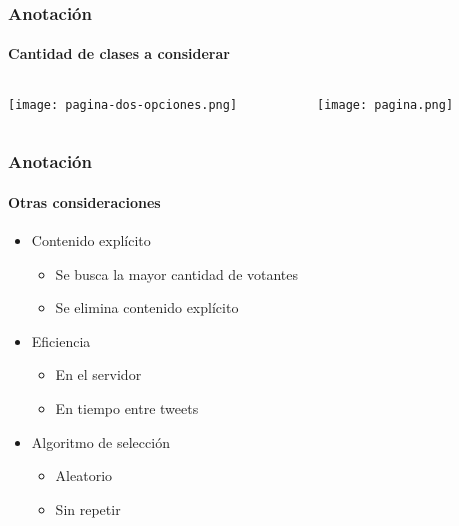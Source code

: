 \begin{frame}
\frametitle{Anotación}
\framesubtitle{Cantidad de clases a considerar}
        \begin{center}
        \begin{columns}[c]
            \begin{column}[c]{0.50\textwidth}
                \centering
                \texttt{[image: pagina-dos-opciones.png]}
            \end{column}
            
            \begin{column}[c]{0.50\textwidth}
                \centering
                \texttt{[image: pagina.png]}
            \end{column}
        \end{columns}
    \end{center}
\end{frame}
\begin{frame}
    \frametitle{Anotación}
    \framesubtitle{Otras consideraciones}

    \begin{itemize}
        \item Contenido explícito

        \begin{itemize}
            \item Se busca la mayor cantidad de votantes
            \item Se elimina contenido explícito
        \end{itemize}

        \item Eficiencia

        \begin{itemize}
            \item En el servidor
            \item En tiempo entre tweets
        \end{itemize}

        \item Algoritmo de selección

        \begin{itemize}
            \item Aleatorio
            \item Sin repetir
        \end{itemize}
    \end{itemize}
\end{frame}

